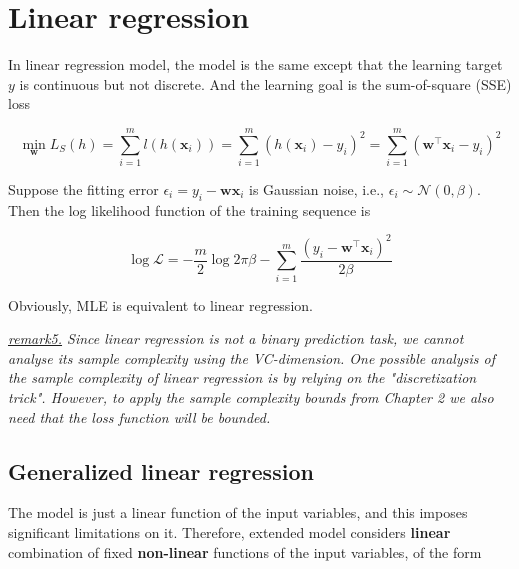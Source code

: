 \documentclass{article}
\begin{document}
\section{Linear regression}

	In linear regression model, the model is the same except that the learning target $y$ is continuous but not discrete. And the learning goal is the sum-of-square (SSE) loss

	\begin{equation}
	\min_\mathbf{w} L_S(h) =\sum_{i=1}^m  l(h(\mathbf{x}_i)) = \sum_{i=1}^m (h(\mathbf{x}_i) - y_i)^2 = \sum_{i=1}^m (\mathbf{w}^\top\mathbf{x}_i - y_i)^2 
	\end{equation}

	Suppose the fitting error $\epsilon_i = y_i-\mathbf{wx}_i$ is Gaussian noise, i.e., $\epsilon_i \sim\mathcal{N}(0,\beta)$. Then the log likelihood function of the training sequence is
	
	\begin{equation}
	\log \mathcal{L} = -\frac{m}{2} \log 2\pi\beta - \sum_{i=1}^m \frac{(y_i-\mathbf{w}^\top\mathbf{x}_i)^2}{2\beta}
	\end{equation}

	Obviously, MLE is equivalent to linear regression.

	\vspace{2mm}
	\begin{scriptsize}
	\begin{spacing}{1.2}
	{\sffamily
	\noindent \textit{\underline{remark5.} Since linear regression is not a binary prediction task, we cannot analyse its sample complexity using the VC-dimension. One possible analysis of the sample complexity of linear regression is by relying on the "discretization trick". However, to apply the sample complexity bounds from Chapter 2 we also need that the loss function will be bounded.}}
	\end{spacing}
	\end{scriptsize}
	\vspace{-2mm}
	
	\subsection{Generalized linear regression}
	
	The model is just a linear function of the input variables, and this imposes significant limitations on it. Therefore, extended model considers \textbf{linear} combination of fixed \textbf{non-linear} functions of the input variables, of the form
	
\end{document}
